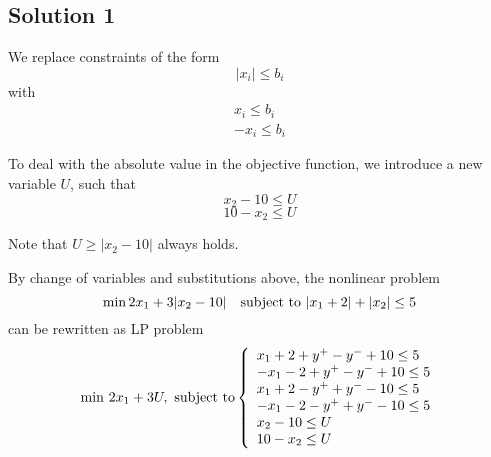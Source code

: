 \documentclass{article}
\begin{document}
\subsection{Solution 1}
We replace constraints of the form
\begin{equation} |x_i| \leq b_i \end{equation}
with
\begin{equation}
\begin{split}
	x_i \leq b_i \\
	-x_i \leq b_i
\end{split}
\end{equation}

To deal with the absolute value in the objective function, we introduce a new variable $U$, such that
\[ x_2 -10 \leq U \]
\[ 10 - x_2 \leq U \]

Note that $U \geq |x_2 -10|$ always holds.


By change of variables and substitutions above, the nonlinear problem
\[ \min 2 x_1 + 3|x_2 - 10| \quad \textnormal{subject to~} |x_1 + 2| + |x_2| \leq 5 \]
can be rewritten as LP problem
\begin{equation}
\min \, 2x_1+3U, \textnormal{ subject to}
\left\{
    \begin{array}{l}
    x_1 + 2 + y^+ - y^- + 10 \leq 5 \\
    -x_1 - 2 + y^+ - y^- + 10 \leq 5 \\
    x_1 + 2 - y^+ + y^- - 10 \leq 5 \\
    -x_1 - 2 - y^+ + y^- - 10 \leq 5 \\
    x_2 -10 \leq U \\
    10 - x_2 \leq U 
    \end{array}
\right.
\end{equation}
\end{document}

